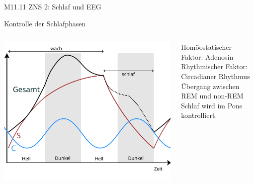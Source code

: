 \documentclass{beamer}
\begin{document}
\begin{frame}{M11.11 ZNS 2: Schlaf und EEG}
\begin{block}{Kontrolle der Schlafphasen}
\begin{columns}[c]
\begin{column}{3cm}
    \begin{center}
        \includegraphics[width=\textwidth]{Zwei-prozess-modell_gesamt_2.png}
    \end{center}
    
    \end{column}
    
    \begin{column}{8cm}
    Homöostatischer Faktor: Adenosin  \\
    Rhythmischer Faktor: Circadianer Rhythmus \\
    Übergang zwischen REM und non-REM Schlaf wird im Pons kontrolliert. 


    
    \end{column}
    
    \end{columns}
    



    
    
    \end{block}
    
\end{frame}
\end{document}

